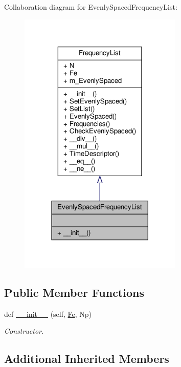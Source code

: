 Collaboration diagram for Evenly\+Spaced\+Frequency\+List\+:
\nopagebreak
\begin{figure}[H]
\begin{center}
\leavevmode
\includegraphics[width=221pt]{classSignalIntegrity_1_1FrequencyDomain_1_1FrequencyList_1_1EvenlySpacedFrequencyList__coll__graph}
\end{center}
\end{figure}
\subsection*{Public Member Functions}
\begin{DoxyCompactItemize}
\item 
def \hyperlink{classSignalIntegrity_1_1FrequencyDomain_1_1FrequencyList_1_1EvenlySpacedFrequencyList_a14670857025f1633a7f1db215d83c385}{\+\_\+\+\_\+init\+\_\+\+\_\+} (self, \hyperlink{classSignalIntegrity_1_1FrequencyDomain_1_1FrequencyList_1_1FrequencyList_a7313483ea19e09cf50b8b58d531b871d}{Fe}, Np)
\begin{DoxyCompactList}\small\item\em Constructor. \end{DoxyCompactList}\end{DoxyCompactItemize}
\subsection*{Additional Inherited Members}


